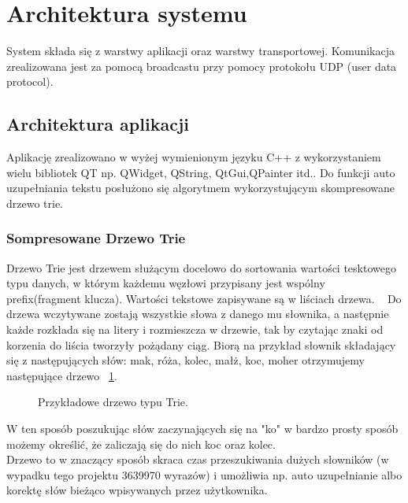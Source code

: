 \documentclass[twoside,a4paper]{book}
\begin{document}
\section{Architektura systemu}
System składa się z warstwy aplikacji oraz warstwy transportowej. Komunikacja zrealizowana jest za pomocą broadcastu przy pomocy protokołu UDP (user data protocol). 

\subsection{Architektura aplikacji}
Aplikację zrealizowano w wyżej wymienionym języku C++ z wykorzystaniem wielu bibliotek QT np. QWidget, QString, QtGui,QPainter itd.. Do funkcji auto uzupełniania tekstu posłużono się algorytmem wykorzystującym skompresowane drzewo trie. 
\subsubsection{Sompresowane Drzewo Trie}
Drzewo Trie jest drzewem służącym docelowo do sortowania wartości tesktowego typu danych, w którym każdemu węzłowi przypisany jest  wspólny prefix(fragment klucza). Wartości tekstowe zapisywane są w liściach drzewa. ~\citep{trieTree}
Do drzewa wczytywane zostają wszystkie słowa z danego mu słownika, a następnie każde rozkłada się na litery i rozmieszcza w drzewie, tak by czytając znaki od korzenia do liścia tworzyły pożądany ciąg. Biorą na przykład słownik składający się z następujących słów: mak, róża, kolec, małż, koc, moher otrzymujemy następujące drzewo ~\ref{fig:trie}.
\begin{figure}[!h]
		\centering
		\caption{Przykładowe drzewo typu Trie. }
		\label{fig:trie}
\end{figure}
W ten sposób poszukując słów zaczynających się na "ko" w bardzo prosty sposób możemy określić, że zaliczają się do nich koc oraz kolec. \\
Drzewo to w znaczący sposób skraca czas przeszukiwania dużych słowników (w wypadku tego projektu 3639970 wyrazów) i umożliwia np. auto uzupełnianie albo korektę słów bieżąco wpisywanych przez użytkownika.
\end{document}

